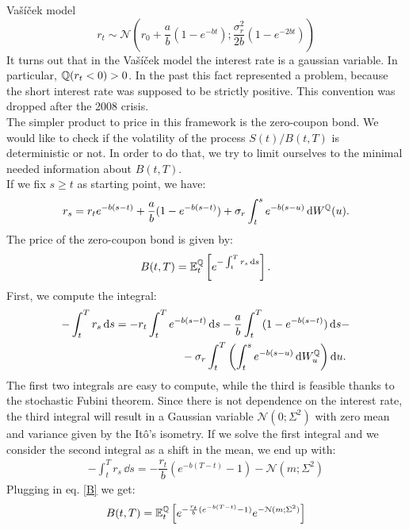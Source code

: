 \begin{example}{Vašíček model}{}{}
    \begin{equation}
        r_t \sim \mathcal{N}\left(r_0 + \frac{a}{b}(1-e^{-bt});\frac{\sigma^2_r}{2b}\left(1-e^{-2bt}\right)\right)
    \end{equation}
    It turns out that in the Vašíček model the interest rate is a gaussian variable. In particular, $\mathbb{Q}(r_t<0)>0$. In the past this fact represented a problem, because the short interest rate was supposed to be strictly positive. This convention was dropped after the 2008 crisis.\\
    The simpler product to price in this framework is the zero-coupon bond. We would like to check if the volatility of the process $S(t)/B(t,T)$ is deterministic or not. In order to do that, we try to limit ourselves to the minimal needed information about $B(t,T)$. \\
    If we fix $s\ge t$ as starting point, we have:
    \begin{equation}
        r_s = r_te^{-b(s-t)} + \frac{a}{b}(1-e^{-b(s-t)}) + \sigma_r \int_t^s e^{-b(s-u)}\,\dd W^{\mathbb{Q}}(u).
    \end{equation}
    The price of the zero-coupon bond is given by:
    \begin{align}\label{B}
        B(t,T) = \mathbb{E}^{\mathbb{Q}}_t\left[e^{-\int_t^Tr_s\,\dd s}\right].
    \end{align}
    First, we compute the integral:
    \begin{align}
        \notag -\int_t^Tr_s\,\dd s &= -r_t\int_t^T e^{-b(s-t)}\,\dd s - \frac{a}{b}\int_t^T(1-e^{-b(s-t)})\,\dd s - \\
        &\qquad\qquad\qquad
        - \sigma_r\int_t^T \left(\int_t^s e^{-b(s-u)}\,\dd W^{\mathbb{Q}}_u\right)\dd u.
    \end{align}
    The first two integrals are easy to compute, while the third is feasible thanks to the stochastic Fubini theorem. Since there is not dependence on the interest rate, the third integral will result in a Gaussian variable $\mathcal{N}(0;\Sigma^2)$ with zero mean and variance given by the Itô's isometry. If we solve the first integral and we consider the second integral as a shift in the mean, we end up with:
    \begin{align}
        -\int_t^Tr_s\,\dd s = -\dfrac{r_t}{b}(e^{-b(T-t)}-1) - \mathcal{N}(m;\Sigma^2)
    \end{align}
    Plugging in eq. \eqref{B} we get:
    \begin{equation}
        B(t,T) = \expect_t\left[e^{-\frac{r_t}{b}(e^{-b(T-t)}-1)}e^{-\mathcal{N}(m;\Sigma^2)}\right]

\end{equation}
\end{example}
